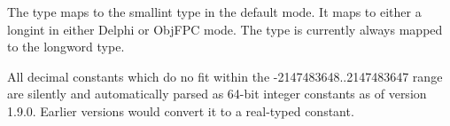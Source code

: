 The  type maps to the smallint type in the default
\fpc mode. It maps to either a longint in either Delphi or ObjFPC
mode. The  type is currently always mapped to the 
longword type. 

\begin{remark}
All decimal constants which do no fit within the -2147483648..2147483647 range 
are silently and automatically parsed as 64-bit integer constants as of version 
1.9.0. Earlier versions would convert it to a real-typed constant.
\end{remark}




